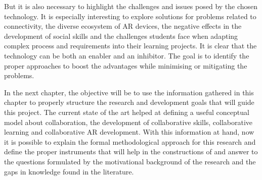 But it is also necessary to highlight the challenges and issues posed by the chosen technology. It is especially interesting to explore solutions for problems related to connectivity, the
diverse ecosystem of \ac{AR} devices, the negative effects in the development of social skills and the challenges students face when adapting complex process and requirements into their
learning projects. It is clear that the technology can be both an enabler and an inhibitor. The goal is to identify the proper approaches to boost the advantages while minimising or
mitigating the problems.

In the next chapter, the objective will be to use the information gathered in this chapter to properly structure the research and development goals that will guide this project. The
current state of the art helped at defining a useful conceptual model about collaboration, the development of collaborative skills, collaborative learning and collaborative \ac{AR}
development. With this information at hand, now it is possible to explain the formal methodological approach for this research and define the proper instruments that will help in the
constructions of and answer to the questions formulated by the motivational background of the research and the gaps in knowledge found in the literature.